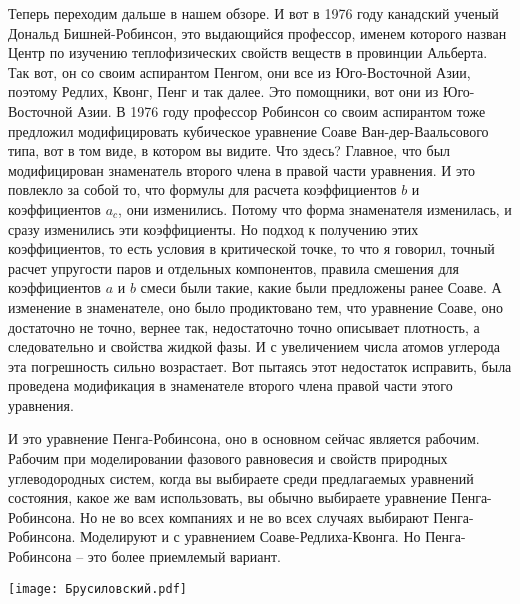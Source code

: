\documentclass[main.tex]{subfiles}
\begin{document}
Теперь переходим дальше в нашем обзоре.
И вот в 1976 году канадский ученый Дональд Бишней-Робинсон, это выдающийся профессор, именем которого назван Центр по изучению теплофизических свойств веществ в провинции Альберта.
Так вот, он со своим аспирантом Пенгом, они все из Юго-Восточной Азии, поэтому Редлих, Квонг, Пенг и так далее.
Это помощники, вот они из Юго-Восточной Азии.
В 1976 году профессор Робинсон со своим аспирантом тоже предложил модифицировать кубическое уравнение Соаве Ван-дер-Ваальсового типа, вот в том виде, в котором вы видите.
Что здесь?
Главное, что был модифицирован знаменатель второго члена в правой части уравнения.
И это повлекло за собой то, что формулы для расчета коэффициентов $b$ и коэффициентов $a_c$, они изменились.
Потому что форма знаменателя изменилась, и сразу изменились эти коэффициенты.
Но подход к получению этих коэффициентов, то есть условия в критической точке, то что я говорил, точный расчет упругости паров и отдельных компонентов, правила смешения для коэффициентов $a$ и $b$ смеси были такие, какие были предложены ранее Соаве.
А изменение в знаменателе, оно было продиктовано тем, что уравнение Соаве, оно достаточно не точно, вернее так, недостаточно точно описывает плотность, а следовательно и свойства жидкой фазы.
И с увеличением числа атомов углерода эта погрешность сильно возрастает.
Вот пытаясь этот недостаток исправить, была проведена модификация в знаменателе второго члена правой части этого уравнения.

И это уравнение Пенга-Робинсона, оно в основном сейчас является рабочим.
Рабочим при моделировании фазового равновесия и свойств природных углеводородных систем, когда вы выбираете среди предлагаемых уравнений состояния, какое же вам использовать, вы обычно выбираете уравнение Пенга-Робинсона.
Но не во всех компаниях и не во всех случаях выбирают Пенга-Робинсона.
Моделируют и с уравнением Соаве-Редлиха-Квонга.
Но Пенга-Робинсона -- это более приемлемый вариант.

\begin{center}
\texttt{[image: Брусиловский.pdf]}
\end{center}
\end{document}
